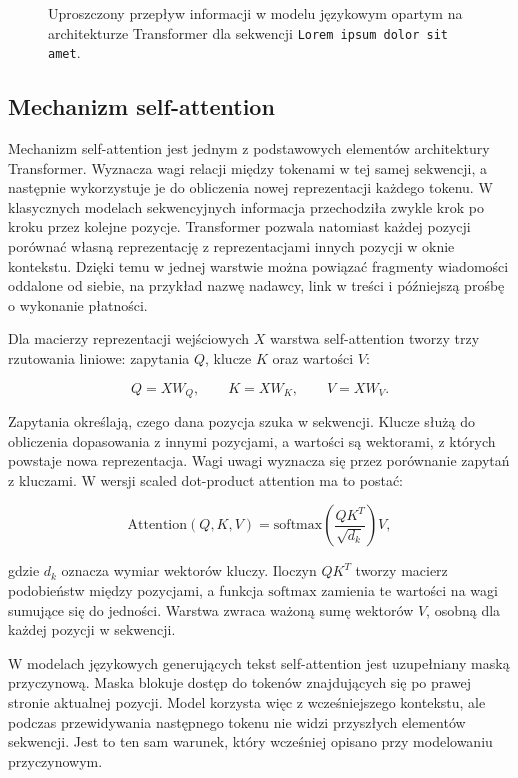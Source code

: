 \begin{figure}[p]
\centering
\resizebox{!}{0.77\textheight}{}
\caption[Przepływ informacji w modelu opartym na architekturze Transformer]
{Uproszczony przepływ informacji w modelu językowym opartym na
architekturze Transformer dla sekwencji \texttt{Lorem ipsum dolor sit amet}.
}
\label{fig:transformer-overview}
\end{figure}

\subsection{Mechanizm self-attention}

Mechanizm self-attention jest jednym z podstawowych elementów architektury
Transformer. Wyznacza wagi relacji między tokenami w tej samej sekwencji, a
następnie wykorzystuje je do obliczenia nowej reprezentacji każdego tokenu. W
klasycznych modelach sekwencyjnych
informacja przechodziła zwykle krok po kroku przez kolejne pozycje. Transformer
pozwala natomiast każdej pozycji porównać własną reprezentację z reprezentacjami
innych pozycji w oknie kontekstu. Dzięki temu w jednej warstwie można powiązać
fragmenty wiadomości oddalone od siebie, na przykład nazwę nadawcy, link w
treści i późniejszą prośbę o wykonanie płatności.

Dla macierzy reprezentacji wejściowych \(X\) warstwa self-attention tworzy trzy
rzutowania liniowe: zapytania \(Q\), klucze \(K\) oraz wartości \(V\):

\[
Q = XW_Q,\qquad K = XW_K,\qquad V = XW_V.
\]

Zapytania określają, czego dana pozycja szuka w sekwencji. Klucze służą do
obliczenia dopasowania z innymi pozycjami, a wartości są wektorami, z których
powstaje nowa reprezentacja. Wagi uwagi wyznacza się przez porównanie zapytań z
kluczami. W wersji scaled dot-product attention ma to postać:

\[
\mathrm{Attention}(Q,K,V) =
\mathrm{softmax}\left(\frac{QK^T}{\sqrt{d_k}}\right)V,
\]

gdzie \(d_k\) oznacza wymiar wektorów kluczy. Iloczyn \(QK^T\) tworzy macierz
podobieństw między pozycjami, a funkcja \(\mathrm{softmax}\) zamienia te wartości
na wagi sumujące się do jedności. Warstwa zwraca ważoną sumę wektorów \(V\),
osobną dla każdej pozycji w sekwencji.

W modelach językowych generujących tekst self-attention jest uzupełniany maską
przyczynową. Maska blokuje dostęp do tokenów znajdujących się po prawej stronie
aktualnej pozycji. Model korzysta więc z wcześniejszego kontekstu, ale podczas
przewidywania następnego tokenu nie widzi przyszłych elementów sekwencji. Jest
to ten sam warunek, który wcześniej opisano przy modelowaniu przyczynowym.

